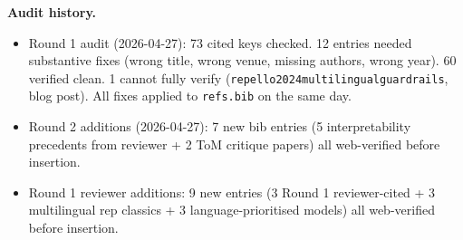\documentclass[11pt,a4paper]{article}
\begin{document}
\textbf{Audit history.}
\begin{itemize}
  \item Round 1 audit (2026-04-27): 73 cited keys checked. 12 entries needed substantive fixes (wrong title, wrong venue, missing authors, wrong year). 60 verified clean. 1 cannot fully verify (\texttt{repello2024multilingualguardrails}, blog post). All fixes applied to \texttt{refs.bib} on the same day.
  \item Round 2 additions (2026-04-27): 7 new bib entries (5 interpretability precedents from reviewer + 2 ToM critique papers) all web-verified before insertion.
  \item Round 1 reviewer additions: 9 new entries (3 Round 1 reviewer-cited + 3 multilingual rep classics + 3 language-prioritised models) all web-verified before insertion.
\end{itemize}
\end{document}
